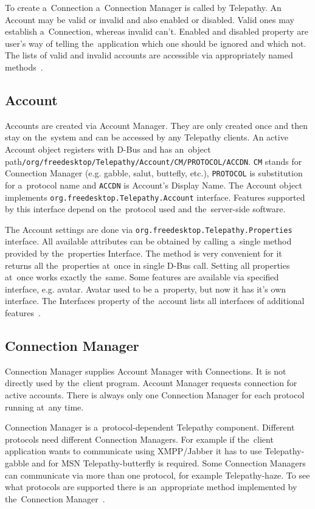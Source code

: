 To create a~Connection a~Connection Manager is called by Telepathy. An Account may be valid or invalid and also enabled or disabled. Valid ones may establish a~Connection, whereas invalid can't. Enabled and disabled property are user's way of telling the~application which one should be ignored and which not. The lists of valid and invalid accounts are accessible via appropriately named methods~\cite{TPWiki}.

\subsection*{Account}
Accounts are created via Account Manager. They are only created once and then stay on the~system and can be accessed by any Telepathy clients. An active Account object registers with D-Bus and has an~object path\newline\verb|/org/freedesktop/Telepathy/Account/CM/PROTOCOL/ACCDN|. \verb|CM| stands for Connection Manager (e.g. gabble, salut, buttefly, etc.), \verb|PROTOCOL| is substitution for a~protocol name and \verb|ACCDN| is Account's Display Name. The Account object implements \verb|org.freedesktop.Telepathy.Account| interface. Features supported by this interface depend on the~protocol used and the~server-side software. 

The Account settings are done via \verb|org.freedesktop.Telepathy.Properties| interface. All available attributes can be obtained by calling a~single method provided by the~properties Interface. The method is very convenient for it returns all the~properties at~once in single D-Bus call. Setting all properties at~once works exactly the~same. Some features are available via specified interface, e.g. avatar. Avatar used to be a~property, but now it has it's own interface. The Interfaces property of the~account lists all interfaces of additional features~\cite{TPWiki}.

\subsection*{Connection Manager}
Connection Manager supplies Account Manager with Connections. It is not directly used by the~client program. Account Manager requests connection for active accounts. There is always only one Connection Manager for each protocol running at~any time.

Connection Manager is a~protocol-dependent Telepathy component. Different protocols need different Connection Managers. For example if the~client application wants to communicate using XMPP/Jabber it has to use Telepathy-gabble and for MSN Telepathy-butterfly is required. Some Connection Managers can communicate via more than one protocol, for example Telepathy-haze. To see what protocols are supported there is an~appropriate method implemented by the~Connection Manager~\cite{TPWiki}.

